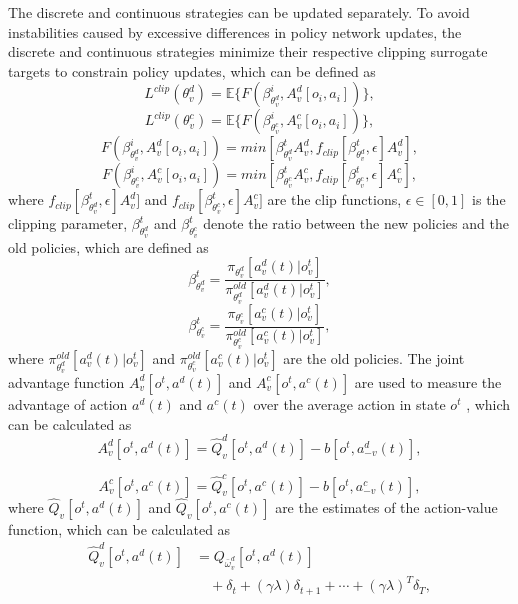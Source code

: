 \documentclass[lettersize,journal]{IEEEtran}
\begin{document}
The discrete and continuous strategies can be updated separately. To avoid instabilities caused by excessive differences in policy network updates, the discrete and continuous strategies minimize their respective clipping surrogate targets to constrain policy updates, which can be defined as
\begin{equation}
L^{clip}(\theta_v^d) = \mathbb{E}\{F(\beta_{\theta_v^d}^i,A_v^d[o_i,a_i])\},\label{ld}
\end{equation}
\begin{equation}
L^{clip}(\theta_v^c) = \mathbb{E}\{F(\beta_{\theta_v^c}^i,A_v^c[o_i,a_i])\},\label{cd}
\end{equation}
\begin{equation}
F(\beta_{\theta_v^d}^i,A_v^d[o_i,a_i])=min[\beta_{\theta_v^d}^t A_v^d,{f}_{clip}[\beta_{\theta_v^d}^t,\epsilon] A_v^d],\label{fund}
\end{equation}
\begin{equation}
F(\beta_{\theta_v^c}^i,A_v^c[o_i,a_i])=min[\beta_{\theta_v^c}^t A_v^c,{f}_{clip}[\beta_{\theta_v^c}^t,\epsilon] A_v^c],\label{fund}
\end{equation}
where ${f}_{clip}[\beta_{\theta_v^d}^t,\epsilon] A_v^d]$ and ${f}_{clip}[\beta_{\theta_v^c}^t,\epsilon] A_v^c]$ are the clip functions, $\epsilon\in[0,1]$ is the clipping parameter, $\beta_{\theta_v^d}^t$ and $\beta_{\theta_v^c}^t$ denote the ratio  between the new policies and the old policies, which are defined as
\begin{equation}
\beta_{\theta_v^d}^t=\frac{\pi_{\theta_v^d} [a_v^d(t)|o_v^t]}{\pi_{\theta_v^d}^{old} [a_v^d(t)|o_v^t]},\label{db} 
\end{equation}
\begin{equation}
\beta_{\theta_v^c}^t=\frac{\pi_{\theta_v^c} [a_v^c(t)|o_v^t]}{\pi_{\theta_v^c}^{old} [a_v^c(t)|o_v^t]},\label{db} 
\end{equation}
where $\pi_{\theta_v^d}^{old} [a_v^d(t)|o_v^t]$ and $\pi_{\theta_v^c}^{old} [a_v^c(t)|o_v^t]$ are the old policies. The joint advantage function $A_v^d[o^t,a^d(t)]$ and $A_v^c[o^t,a^c(t)]$ are used to measure the advantage of action $a^d(t)$ and $a^c(t)$ over the average action in state $o^t$ \cite{DelinGuo2020MAPPO}, which can be calculated as
\begin{equation}
A_v^d[o^t,a^d(t)]=\hat{Q}_v^d[o^t, a^d(t)]-b[o^t, a^d_{-v}(t)],\label{advd} 
\end{equation}

\begin{equation}
A_v^c[o^t,a^c(t)]=\hat{Q}_v^c[o^t, a^c(t)]-b[o^t, a^c_{-v}(t)],\label{advc} 
\end{equation}
where $\hat{Q}_{v}[o^t, a^d(t)]$ and $\hat{Q}_{v}[o^t, a^c(t)]$ are the estimates of the action-value function, which can be calculated as 
\begin{equation}
\begin{aligned}
\hat{Q}_v^d[o^t, a^d(t)]&=Q_{\bar{\omega}_v^d}[o^t, a^d(t)] \\
& \quad +\delta_{t}+(\gamma \lambda) \delta_{t+1}+\cdots+(\gamma \lambda)^{T} \delta_{T},\label{hatqd}
\end{aligned}
\end{equation}
\end{document}
